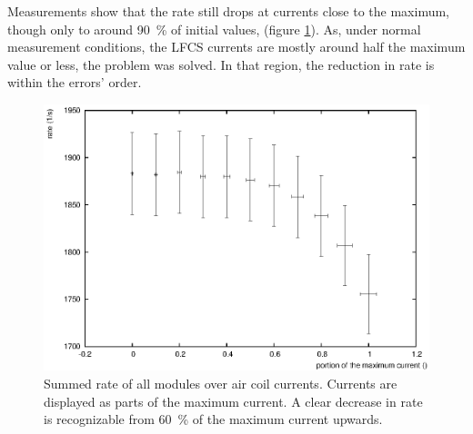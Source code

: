   Measurements show that the rate still drops at currents close to the maximum, though only to around \SI{90}{\percent} of initial values, (figure \ref{fig:aircoilCountsCurrent}). As, under normal measurement conditions, the LFCS currents are mostly around half the maximum value or less, the problem was solved. In that region,  the reduction in rate is within the errors' order.
  \begin{figure}

  \centering
  	\includegraphics[width = 0.9 \textwidth]{graphics/aircoilCounts/aircoilsCountsCurrent.eps}
  	\caption[Rate dependence on Magnetic Fields]{Summed rate of all modules over air coil currents. Currents are displayed as parts of the maximum current. A clear decrease in rate is recognizable from \SI{60}{\percent} of the maximum current upwards.}
  	\label{fig:aircoilCountsCurrent}
  \end{figure}
  

